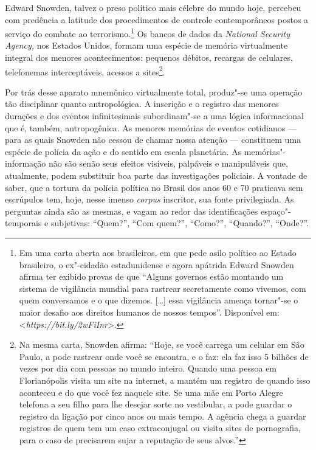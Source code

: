 Edward Snowden, talvez o preso político mais célebre do mundo hoje,
percebeu com predência a latitude dos procedimentos de controle
contemporâneos postos a serviço do combate ao
terrorismo.\footnote{Em uma carta aberta aos
  brasileiros, em que pede asilo político ao Estado brasileiro, o
  ex"-cidadão estadunidense e agora apátrida Edward Snowden afirma ter
  exibido provas de que ``Alguns governos estão montando
  um sistema de vigilância mundial para rastrear secretamente como
  vivemos, com quem conversamos e o que dizemos. {[}\ldots{}{]} essa
  vigilância ameaça tornar"-se o maior desafio aos direitos humanos de
  nossos tempos''. Disponível em:
  \textless{}\emph{https://bit.ly/2wFiInr}\textgreater{}.}
Os bancos de dados da \emph{National Security Agency, }nos Estados
Unidos, formam uma espécie de memória virtualmente integral dos menores
acontecimentos: pequenos débitos, recargas de celulares, telefonemas
interceptáveis, acessos a sites\footnote{Na
  mesma carta, Snowden afirma: ``Hoje, se você carrega um celular em São
  Paulo, a  pode rastrear onde você se encontra, e o faz: ela faz
  isso 5 bilhões de vezes por dia com pessoas no mundo inteiro. Quando
  uma pessoa em Florianópolis visita um site na internet, a  mantém
  um registro de quando isso aconteceu e do que você fez naquele site.
  Se uma mãe em Porto Alegre telefona a seu filho para lhe desejar sorte
  no vestibular, a  pode guardar o registro da ligação por cinco anos
  ou mais tempo. A agência chega a guardar registros de quem tem um caso
  extraconjugal ou visita sites de pornografia, para o caso de
  precisarem sujar a reputação de seus alvos.''}.

Por trás desse aparato mnemônico virtualmente total, produz"-se uma
operação tão disciplinar quanto antropológica. A inscrição e o registro
das menores durações e dos eventos infinitesimais subordinam"-se a uma
lógica informacional que é, também, antropogênica. As menores memórias
de eventos cotidianos --- para as quais Snowden não cessou de chamar
nossa atenção --- constituem uma espécie de polícia da ação e do sentido
em escala planetária. As memórias"-informação não são senão seus efeitos
visíveis, palpáveis e manipuláveis que, atualmente, podem substituir boa
parte das investigações policiais. A vontade de saber, que a tortura da
polícia política no Brasil dos anos 60 e 70 praticava sem escrúpulos
tem, hoje, nesse imenso \emph{corpus }inscritor, sua fonte privilegiada.
As perguntas ainda são as mesmas, e vagam ao redor das identificações
espaço"-temporais e subjetivas: ``Quem?'', ``Com quem?'', ``Como?'',
``Quando?'', ``Onde?''.

